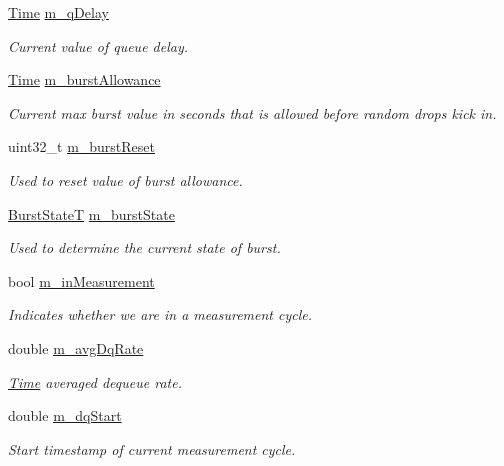 \begin{DoxyCompactItemize}
\hyperlink{classns3_1_1Time}{Time} \hyperlink{classns3_1_1PieQueueDisc_ae255bc246482a1d19fe8548ad5500182}{m\+\_\+q\+Delay}
\begin{DoxyCompactList}\small\item\em Current value of queue delay. \end{DoxyCompactList}\item 
\hyperlink{classns3_1_1Time}{Time} \hyperlink{classns3_1_1PieQueueDisc_a563714deac3a4d2f55f823b964c1b8b8}{m\+\_\+burst\+Allowance}
\begin{DoxyCompactList}\small\item\em Current max burst value in seconds that is allowed before random drops kick in. \end{DoxyCompactList}\item 
uint32\+\_\+t \hyperlink{classns3_1_1PieQueueDisc_a85157ab176cd53b269993752d39faa76}{m\+\_\+burst\+Reset}
\begin{DoxyCompactList}\small\item\em Used to reset value of burst allowance. \end{DoxyCompactList}\item 
\hyperlink{classns3_1_1PieQueueDisc_ad1530234d55d1552449983fd84b27d55}{Burst\+StateT} \hyperlink{classns3_1_1PieQueueDisc_a5da0c5c78affc315cab73ba4e41f0482}{m\+\_\+burst\+State}
\begin{DoxyCompactList}\small\item\em Used to determine the current state of burst. \end{DoxyCompactList}\item 
bool \hyperlink{classns3_1_1PieQueueDisc_a93d085fcecf8febe3144f913f230e357}{m\+\_\+in\+Measurement}
\begin{DoxyCompactList}\small\item\em Indicates whether we are in a measurement cycle. \end{DoxyCompactList}\item 
double \hyperlink{classns3_1_1PieQueueDisc_a83830fdf72e0b5e7809e403fcba45ffa}{m\+\_\+avg\+Dq\+Rate}
\begin{DoxyCompactList}\small\item\em \hyperlink{classns3_1_1Time}{Time} averaged dequeue rate. \end{DoxyCompactList}\item 
double \hyperlink{classns3_1_1PieQueueDisc_a9d3eecd9c565536a646c87db0853b298}{m\+\_\+dq\+Start}
\begin{DoxyCompactList}\small\item\em Start timestamp of current measurement cycle. \end{DoxyCompactList}\item 

\end{DoxyCompactItemize}
